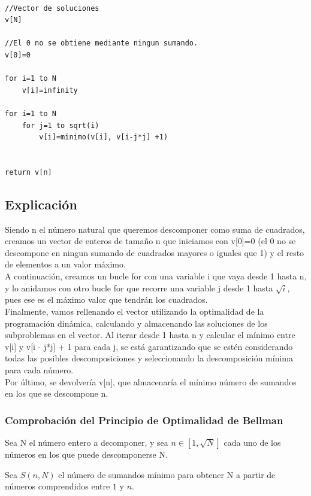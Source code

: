 \documentclass[a4paper,12pt,twoside]{article} %
\begin{document}
\lstset{language=C++}
\begin{lstlisting}

//Vector de soluciones
v[N]

//El 0 no se obtiene mediante ningun sumando.
v[0]=0

for i=1 to N
    v[i]=infinity

for i=1 to N
    for j=1 to sqrt(i)
        v[i]=minimo(v[i], v[i-j*j] +1)

    
return v[n]

\end{lstlisting}
\newpage

\subsection{Explicación}
Siendo n el número natural que queremos descomponer como suma de cuadrados, creamos un vector de enteros de tamaño n que iniciamos con v[0]=0 (el 0 no se descompone en ningun sumando de cuadrados mayores o iguales que 1) y el resto de elementos a un valor máximo.\\

A continuación, creamos un bucle for con una variable i que vaya desde 1 hasta n, y lo anidamos con otro bucle for que recorre una variable j desde 1 hasta $\sqrt{i}$, pues ese es el máximo valor que tendrán los cuadrados.\\

Finalmente, vamos rellenando el vector utilizando la optimalidad de la programación dinámica, calculando y almacenando las soluciones de los subproblemas en el vector. Al iterar desde 1 hasta n y calcular el mínimo entre v[i] y v[i - j*j] + 1 para cada j, se está garantizando que se estén considerando todas las posibles descomposiciones y seleccionando la descomposición mínima para cada número.\\

Por último, se devolvería v[n], que almacenaría el mínimo número de sumandos en los que se descompone n.

\subsubsection{Comprobación del Principio de Optimalidad de Bellman}
Sea N el número entero a decomponer, y sea $n \in [1,\sqrt{N}]$ cada uno de los números en los que puede descomponerse N.

Sea $S(n,N)$ el número de sumandos mínimo para obtener N a partir de números comprendidos entre $1$ y $n$.
\end{document}
